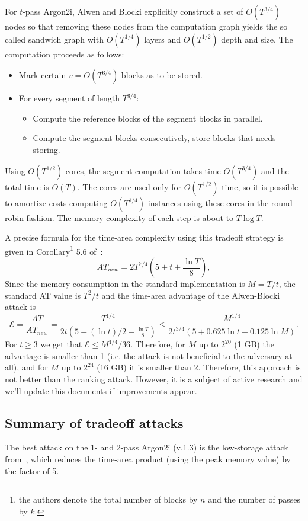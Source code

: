 \documentclass[a4paper]{article}
\begin{document}
For $t$-pass Argon2i, Alwen and Blocki  explicitly construct a set of $O(T^{3/4})$ nodes so that removing these nodes from the computation graph yields the so called sandwich graph with $O(T^{1/4})$ layers and  $O(T^{1/2})$ depth and size. The computation proceeds as follows:
\begin{itemize}
    \item Mark certain $v = O(T^{3/4})$ blocks as to be stored.
    \item For every segment of length $T^{3/4}$:
    \begin{itemize}
        \item Compute the reference blocks of the segment blocks in parallel.
        \item Compute the segment blocks consecutively, store blocks that needs storing.
    \end{itemize}
\end{itemize}
Using $O(T^{1/2})$ cores, the segment computation takes time $O(T^{3/4})$ and the total time is $O(T)$. The cores are used only for $O(T^{1/2})$ time, so it is possible to amortize costs  computing $O(T^{1/4})$ instances using these cores in the round-robin fashion. The memory complexity of each step is about to $T\log T$.

A  precise formula for the time-area complexity using this tradeoff strategy is given in Corollary\footnote{the authors denote the total number of blocks by $n$ and the number of passes by $k$.} 5.6 of~\cite{AB16}:
$$
AT_{new}= 2 T^{7/4}\left(5+ t + \frac{\ln T}{8} \right),
$$
Since the memory consumption in the standard implementation is $M=T/t$, the standard AT value is $T^2/t$ and the time-area advantage of the Alwen-Blocki attack is  
$$
\mathcal{E} = \frac{AT}{AT_{new}} = \frac{T^{1/4}}{2t(5+(\ln t)/2+\frac{\ln T}{8})}\leq
\frac{M^{1/4}}{2t^{3/4}(5+0.625\ln t + 0.125 \ln M)}.
$$
For $t\geq 3$ we get that $\mathcal{E} \leq M^{1/4}/36$. Therefore, for $M$ up to $2^{20}$ (1 GB) the advantage is smaller than 1 (i.e. the attack is not beneficial to the adversary at all), and for $M$ up to $2^{24}$ (16 GB) it is smaller than 2. Therefore, this approach is not better than the ranking attack. However, it is a subject of active research and we'll update this documents if improvements appear.

\subsection{Summary of tradeoff attacks}

The best attack on the 1- and 2-pass Argon2i (v.1.3) is the low-storage attack  from~\cite{Corrigan-GibbsB16}, which reduces the time-area product (using the peak memory value) by the factor of 5.
\end{document}
